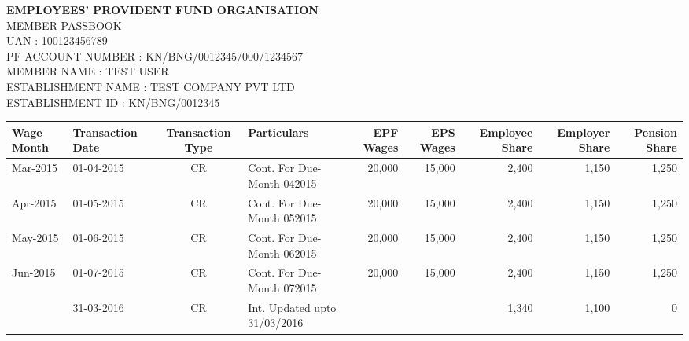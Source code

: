 \documentclass[8pt]{extarticle}
\begin{document}
\noindent\textbf{EMPLOYEES' PROVIDENT FUND ORGANISATION}\\
MEMBER PASSBOOK\\[3pt]
UAN : 100123456789\\
PF ACCOUNT NUMBER : KN/BNG/0012345/000/1234567\\
MEMBER NAME : TEST USER\\
ESTABLISHMENT NAME : TEST COMPANY PVT LTD\\
ESTABLISHMENT ID : KN/BNG/0012345\\[6pt]
\begin{tabular}{|l|l|c|l|r|r|r|r|r|}
\hline
Wage Month & Transaction Date & Transaction Type & Particulars & EPF Wages & EPS Wages & Employee Share & Employer Share & Pension Share \\
\hline
Mar-2015 & 01-04-2015 & CR & Cont. For Due-Month 042015 & 20,000 & 15,000 & 2,400 & 1,150 & 1,250 \\
\hline
Apr-2015 & 01-05-2015 & CR & Cont. For Due-Month 052015 & 20,000 & 15,000 & 2,400 & 1,150 & 1,250 \\
\hline
May-2015 & 01-06-2015 & CR & Cont. For Due-Month 062015 & 20,000 & 15,000 & 2,400 & 1,150 & 1,250 \\
\hline
Jun-2015 & 01-07-2015 & CR & Cont. For Due-Month 072015 & 20,000 & 15,000 & 2,400 & 1,150 & 1,250 \\
\hline
 & 31-03-2016 & CR & Int. Updated upto 31/03/2016 &  &  & 1,340 & 1,100 & 0 \\
\hline
\end{tabular}
\end{document}
